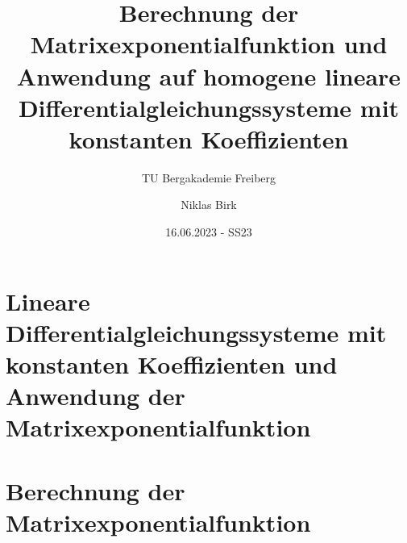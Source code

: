 \documentclass[11pt]{scrartcl}
\title{
    Berechnung der Matrixexponentialfunktion und
    Anwendung auf homogene lineare Differentialgleichungssysteme mit konstanten Koeffizienten
}
\subtitle{TU Bergakademie Freiberg}
\author{Niklas Birk}
\date{16.06.2023 - SS23}
\begin{document}
    \maketitle
    \tableofcontents

    \printbibliography

    \newpage

    \section{Lineare Differentialgleichungssysteme mit konstanten Koeffizienten und Anwendung der Matrixexponentialfunktion}\label{sec:dgls-matrixexponential}
    

    \section{Berechnung der Matrixexponentialfunktion}\label{sec:berechnung-matrixexponential}
    
\end{document}
